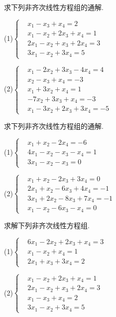 \begin{ex}\label{5.9}
求下列非齐次线性方程组的通解.

(1)$\left\{\begin{aligned}& x_1      - x_3+ x_4=2 \\& x_1-x_2+ 2x _3+ x_4=1 \\&2x_1-x_2+ x_3+2x_4=3 \\&3x_1-x_2      +3x_4=5    \end{aligned}\right.$

(2)$\left\{\begin{aligned}& x_1-2x_2+3x_3-4x_4= 4 \\&       x _2- x_3+ x_4=-3 \\& x_1+3x_2      + x_4= 1 \\&    -7x_2+3x_3+ x_4=-3 \\& x_1-3x_2+2x_3+3x_4=-5     \end{aligned}\right.$
\end{ex}

\begin{ex}\label{5.10}
求下列非齐次线性方程组的通解.

(1)$\left\{\begin{aligned}&x_1+x_2     -2x_4=-6 \\&4x_1-x_2-x_3- x_4= 1 \\&3x_1-x_2-x_3      = 0     \end{aligned}\right.$

(2)$\left\{\begin{aligned}&x_1+ x_2-2x_3+3x_4= 0 \\&2x_1+ x_2-6x_3+4x_4=-1 \\& 3x_1+2x _2-8x_3+7x_4=-1 \\& x_1- x_2-6x_3- x_4= 0     \end{aligned}\right.$
\end{ex}

\begin{ex}\label{5.11}
求解下列非齐次线性方程组.

(1)$\left\{\begin{aligned}&6x_1-2x_2+2x_3+ x_4=3 \\& x_1- x_2      + x_4=1 \\&2x_1      + x_3+3x_4=2     \end{aligned}\right.$

(2)$\left\{\begin{aligned}&x_1- x_2+2x_3+ x_4=1 \\&2x_1- x_2+ x_3+2x_4=3 \\& x_1- x_3+ x_4=2 \\&3x_1-x_2     +3x_4=5     \end{aligned}\right.$
\end{ex}

